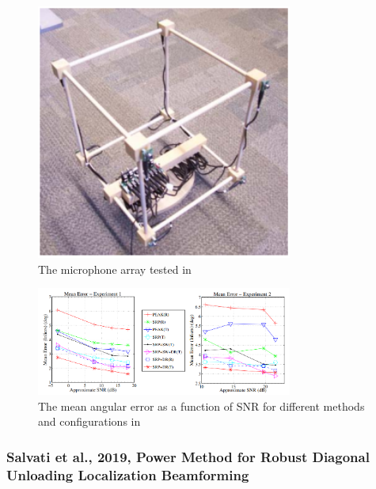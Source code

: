 \documentclass{report}
\begin{document}
\begin{figure}[H]
\includegraphics[width=0.75\textwidth]{./badali_2009/array.png}
\centering
\caption{The microphone array tested in \cite{badali_evaluating_2009}}
\label{fig:badali_2009_array}
\centering
\end{figure}

\begin{figure}[H]
\includegraphics[width=0.75\textwidth]{./badali_2009/error_SNR.png}
\centering
\caption{The mean angular error as a function of SNR for different methods and configurations in \cite{badali_evaluating_2009}}
\label{fig:badali_2009_error_SNR}
\centering
\end{figure}

\subsubsection{Salvati et al., 2019, Power Method for Robust Diagonal Unloading Localization Beamforming}
\end{document}
